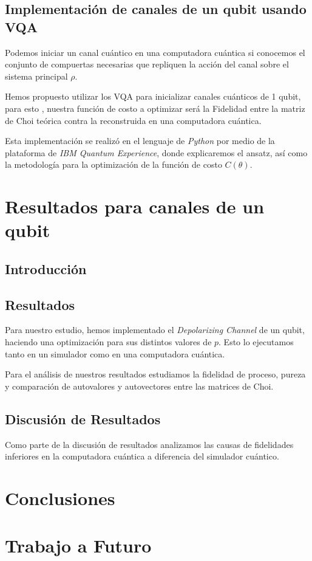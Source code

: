 \documentclass[11pt, spanish, letterpage]{report} %
\newcommand{\1}{\mathbb{1}}
\begin{document}
\section{Implementación de canales de un qubit usando VQA}
Podemos iniciar un canal cuántico en una computadora cuántica si conocemos el conjunto de compuertas necesarias que repliquen la acción del canal sobre el sistema principal $\rho$.

Hemos propuesto utilizar los VQA para inicializar canales cuánticos de 1 qubit, para esto , nuestra función de costo a optimizar será la Fidelidad entre la matriz de Choi teórica contra la reconstruida en una computadora cuántica.

Esta implementación se realizó en el lenguaje de \textit{Python} por medio de la plataforma de \textit{IBM Quantum Experience}, donde explicaremos el ansatz, así como la metodología para la optimización de la función de costo $C(\theta)$.


\chapter{Resultados para canales de un qubit}
\section{Introducción}
\section{Resultados}
Para nuestro estudio, hemos implementado el \textit{Depolarizing Channel} de un qubit, haciendo una optimización para sus distintos valores de $p$. Esto lo ejecutamos tanto en un simulador como en una computadora cuántica.

Para el análisis de nuestros resultados estudiamos la fidelidad de proceso, pureza y comparación de autovalores y autovectores entre las matrices de Choi. 
\section{Discusión de Resultados}
Como parte de la discusión de resultados analizamos las causas de fidelidades inferiores en la computadora cuántica a diferencia del simulador cuántico. 
\chapter{Conclusiones}

\chapter{Trabajo a Futuro}
\end{document}
